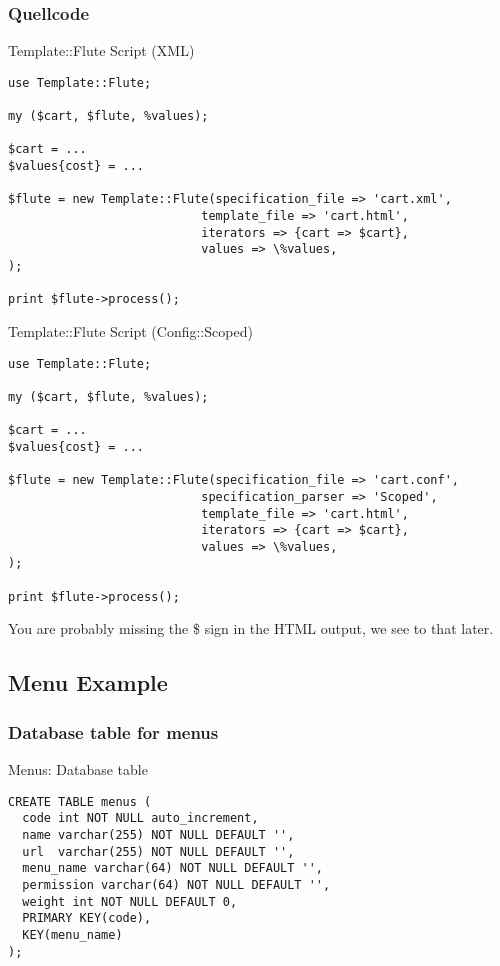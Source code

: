\subsubsection{Quellcode}
\begin{frame}[fragile]{Template::Flute Script (XML)}
\begin{lstlisting}
use Template::Flute;

my ($cart, $flute, %values);

$cart = ...
$values{cost} = ...

$flute = new Template::Flute(specification_file => 'cart.xml',
                           template_file => 'cart.html',
                           iterators => {cart => $cart},
                           values => \%values,
);

print $flute->process();
\end{lstlisting}
\end{frame}

\begin{frame}[fragile]{Template::Flute Script (Config::Scoped)}
\begin{lstlisting}
use Template::Flute;

my ($cart, $flute, %values);

$cart = ...
$values{cost} = ...

$flute = new Template::Flute(specification_file => 'cart.conf',
                           specification_parser => 'Scoped',
                           template_file => 'cart.html',
                           iterators => {cart => $cart},
                           values => \%values,
);

print $flute->process();
\end{lstlisting}
\end{frame}

You are probably missing the \$ sign in the HTML output, we see
to that later.

\subsection{Menu Example}
\subsubsection{Database table for menus}
\begin{frame}[fragile]{Menus: Database table}
\begin{lstlisting}
CREATE TABLE menus (
  code int NOT NULL auto_increment,
  name varchar(255) NOT NULL DEFAULT '',
  url  varchar(255) NOT NULL DEFAULT '',
  menu_name varchar(64) NOT NULL DEFAULT '',
  permission varchar(64) NOT NULL DEFAULT '',
  weight int NOT NULL DEFAULT 0,
  PRIMARY KEY(code),
  KEY(menu_name)
);
\end{lstlisting}
\end{frame}


